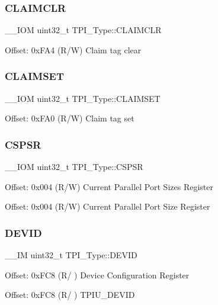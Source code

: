\subsubsection{\texorpdfstring{CLAIMCLR}{CLAIMCLR}}
{\footnotesize\ttfamily \+\_\+\+\_\+\+I\+OM uint32\+\_\+t T\+P\+I\+\_\+\+Type\+::\+C\+L\+A\+I\+M\+C\+LR}

Offset\+: 0x\+F\+A4 (R/W) Claim tag clear \mbox{\label{struct_t_p_i___type_af8b7d15fa5252b733dd4b11fa1b5730a}} 
\subsubsection{\texorpdfstring{CLAIMSET}{CLAIMSET}}
{\footnotesize\ttfamily \+\_\+\+\_\+\+I\+OM uint32\+\_\+t T\+P\+I\+\_\+\+Type\+::\+C\+L\+A\+I\+M\+S\+ET}

Offset\+: 0x\+F\+A0 (R/W) Claim tag set \mbox{\label{struct_t_p_i___type_a8826aa84e5806053395a742d38d59d0f}} 
\subsubsection{\texorpdfstring{CSPSR}{CSPSR}}
{\footnotesize\ttfamily \+\_\+\+\_\+\+I\+OM uint32\+\_\+t T\+P\+I\+\_\+\+Type\+::\+C\+S\+P\+SR}

Offset\+: 0x004 (R/W) Current Parallel Port Sizes Register

Offset\+: 0x004 (R/W) Current Parallel Port Size Register \mbox{\label{struct_t_p_i___type_abc0ecda8a5446bc754080276bad77514}} 
\subsubsection{\texorpdfstring{DEVID}{DEVID}}
{\footnotesize\ttfamily \+\_\+\+\_\+\+IM uint32\+\_\+t T\+P\+I\+\_\+\+Type\+::\+D\+E\+V\+ID}

Offset\+: 0x\+F\+C8 (R/ ) Device Configuration Register

Offset\+: 0x\+F\+C8 (R/ ) T\+P\+I\+U\+\_\+\+D\+E\+V\+ID \mbox{\label{struct_t_p_i___type_ad98855854a719bbea33061e71529a472}} 

